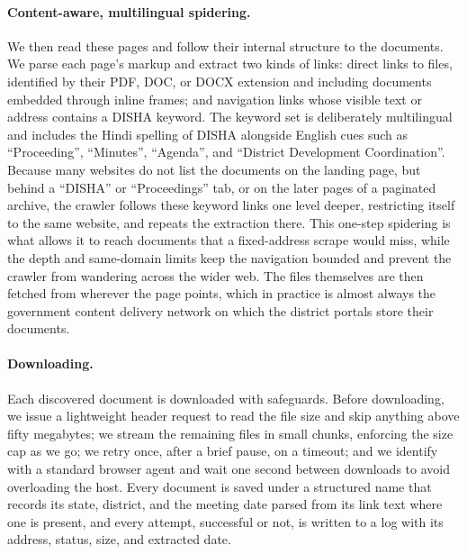 \documentclass[12pt]{article}
\begin{document}
\paragraph{Content-aware, multilingual spidering.} We then read these pages and follow their internal structure to the documents. We parse each page's markup and extract two kinds of links: direct links to files, identified by their PDF, DOC, or DOCX extension and including documents embedded through inline frames; and navigation links whose visible text or address contains a DISHA keyword. The keyword set is deliberately multilingual and includes the Hindi spelling of DISHA alongside English cues such as ``Proceeding'', ``Minutes'', ``Agenda'', and ``District Development Coordination''. Because many websites do not list the documents on the landing page, but behind a ``DISHA'' or ``Proceedings'' tab, or on the later pages of a paginated archive, the crawler follows these keyword links one level deeper, restricting itself to the same website, and repeats the extraction there. This one-step spidering is what allows it to reach documents that a fixed-address scrape would miss, while the depth and same-domain limits keep the navigation bounded and prevent the crawler from wandering across the wider web. The files themselves are then fetched from wherever the page points, which in practice is almost always the government content delivery network on which the district portals store their documents.

\paragraph{Downloading.} Each discovered document is downloaded with safeguards. Before downloading, we issue a lightweight header request to read the file size and skip anything above fifty megabytes; we stream the remaining files in small chunks, enforcing the size cap as we go; we retry once, after a brief pause, on a timeout; and we identify with a standard browser agent and wait one second between downloads to avoid overloading the host. Every document is saved under a structured name that records its state, district, and the meeting date parsed from its link text where one is present, and every attempt, successful or not, is written to a log with its address, status, size, and extracted date.
\end{document}
